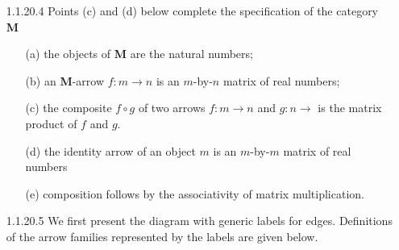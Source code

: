 \documentclass{article}
\begin{document}
\begin{enumerate}
\item[]
\item[1.1.20.4]
  Points (c) and (d) below complete the specification of the category \textbf{M}
  \begin{enumerate}
  \item [(a)]
    the objects of \textbf{M} are the natural numbers;
  \item [(b)]
    an \textbf{M}-arrow $f : m \rightarrow n$ is an $m$-by-$n$ matrix of real numbers;
  \item [(c)]
    the composite $f \circ g$ of two arrows $f : m \rightarrow n$ and $g : n \rightarrow $ is the matrix product of $f$ and $g$.
  \item [(d)]
    the identity arrow of an object $m$ is an $m$-by-$m$ matrix of real numbers
  \item [(e)]
    composition follows by the associativity of matrix multiplication.
  \end{enumerate}

\item[]
\item[1.1.20.5]
  We first present the diagram with generic labels for edges.
  Definitions of the arrow families represented by the labels are given below.

  \begin{center}
  \end{center}


\end{enumerate}
\end{document}
